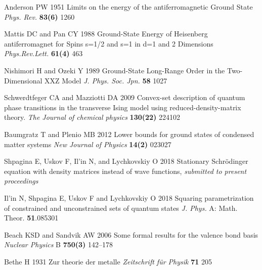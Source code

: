 \documentclass[a4paper]{jpconf}
\renewcommand\[{\begin{equation}}
\renewcommand\]{\end{equation}}
\begin{document}
\begin{thebibliography}{99}



 Anderson PW 1951
Limits on the energy of the antiferromagnetic Ground State
{\it Phys. Rev.} {\bf 83(6)} 1260

 Mattis DC and Pan CY 1988
Ground-State Energy of Heisenberg antiferromagnet for Spins s=1/2 and s=1 in d=1 and 2 Dimensions
{\it Phys.Rev.Lett.} {\bf 61(4)} 463

 Nishimori H and Ozeki Y 1989
Ground-State Long-Range Order in the Two-Dimensional XXZ Model
{\it J. Phys. Soc. Jpn.} {\bf 58} 1027

 Schwerdtfeger CA and Mazziotti DA 2009
Convex-set description of quantum phase transitions in the transverse Ising model using reduced-density-matrix theory.
{\it The Journal of chemical physics} {\bf 130(22)} 224102

 Baumgratz T and Plenio MB 2012
Lower bounds for ground states of condensed matter systems
{\it New Journal of Physics} {\bf 14(2)} 023027

  Shpagina E, Uskov F, Il'in N, and Lychkovskiy O 2018
Stationary Schrödinger equation with density matrices instead of wave functions,
{\it submitted to present proceedings}

 Il'in N, Shpagina E, Uskov F and Lychkovskiy O 2018
Squaring parametrization of constrained and unconstrained sets of quantum states
{\it J. Phys.} A: Math. Theor. {\bf 51}.085301

 Beach KSD and Sandvik AW 2006
Some formal results for the valence bond basis
{\it Nuclear Physics} B {\bf 750(3)} 142–178

 Bethe H 1931 Zur theorie der metalle {\it Zeitschrift für Physik} {\bf 71} 205







\end{thebibliography}

\end{document}
